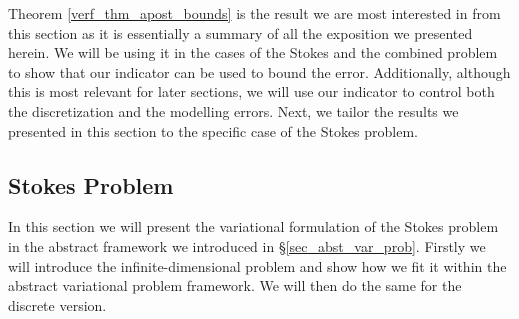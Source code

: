 \documentclass[12pt,a4paper]{article}
\theoremstyle{definition}
\begin{document}
Theorem \ref{verf_thm_apost_bounds} is the result we are most interested in from this section as it is essentially a summary of all the exposition we presented herein.  We will be using it in the cases of the Stokes and the combined problem to show that our indicator can be used to bound the error.  Additionally, although this is most relevant for later sections, we will use our indicator to control both the discretization and the modelling errors. Next, we tailor the results we presented in this section to the specific case of the Stokes problem.
\subsection{Stokes Problem}
In this section we will present the variational formulation of the Stokes problem in the abstract framework we introduced in \S \ref{sec_abst_var_prob}.  Firstly we will introduce the infinite-dimensional problem and show how we fit it within the abstract variational problem framework. We will then do the same for the discrete version.  
\end{document}
